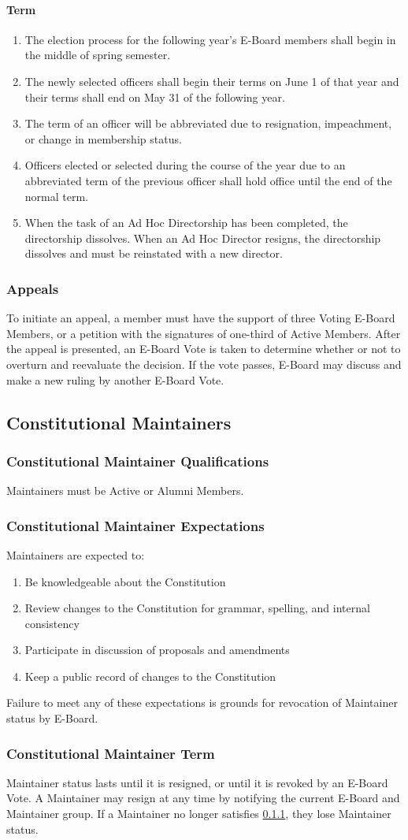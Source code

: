 \documentclass{article}
\newcommand{\asection}[1]{\subsection{#1} \label{#1}}
\newcommand{\asubsection}[1]{\subsubsection{#1} \label{#1}}
\newcommand{\asubsubsection}[1]{\paragraph{#1} \label{#1}}
\begin{document}
\asubsubsection{Term}
\begin{enumerate}
	\item The election process for the following year's E-Board members shall begin in the middle of spring semester.
	\item The newly selected officers shall begin their terms on June 1 of that year and their terms shall end on May 31 of the following year.
	\item The term of an officer will be abbreviated due to resignation, impeachment, or change in membership status.
	\item Officers elected or selected during the course of the year due to an abbreviated term of the previous officer shall hold office until the end of the normal term.
	\item When the task of an Ad Hoc Directorship has been completed, the directorship dissolves.
	      When an Ad Hoc Director resigns, the directorship dissolves and must be reinstated with a new director.
\end{enumerate}

\asubsection{Appeals}
To initiate an appeal, a member must have the support of three Voting E-Board Members, or a petition with the signatures of one-third of Active Members.
After the appeal is presented, an E-Board Vote is taken to determine whether or not to overturn and reevaluate the decision.
If the vote passes, E-Board may discuss and make a new ruling by another E-Board Vote.

\asection{Constitutional Maintainers}

\asubsection{Constitutional Maintainer Qualifications}
Maintainers must be Active or Alumni Members.

\asubsection{Constitutional Maintainer Expectations}
Maintainers are expected to:
\begin{enumerate}
	\item Be knowledgeable about the Constitution
	\item Review changes to the Constitution for grammar, spelling, and internal consistency
	\item Participate in discussion of proposals and amendments
	\item Keep a public record of changes to the Constitution
\end{enumerate}
Failure to meet any of these expectations is grounds for revocation of Maintainer status by E-Board.

\asubsection{Constitutional Maintainer Term}
Maintainer status lasts until it is resigned, or until it is revoked by an E-Board Vote.
A Maintainer may resign at any time by notifying the current E-Board and Maintainer group.
If a Maintainer no longer satisfies \ref{Constitutional Maintainer Qualifications}, they lose Maintainer status.
\end{document}
